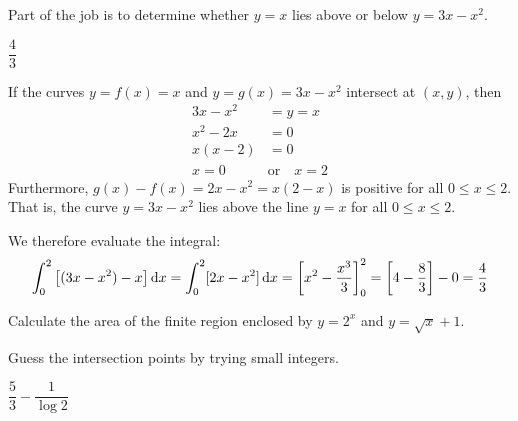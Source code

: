 \begin{hint}
Part of the job is to determine whether $y=x$ lies above or below
$y=3x-x^2$.
\end{hint}

\begin{answer}
$\dfrac{4}{3}$
\end{answer}

\begin{solution}
If the curves $y=f(x)=x$ and $y=g(x)=3x-x^2$ intersect at $(x,y)$, then
\begin{align*}
3x-x^2&=y=x\\
x^2-2x&=0\\
x(x-2)&=0\\
x=0 \quad &\mbox{or} \quad x=2
\end{align*}
Furthermore, $g(x)-f(x) = 2x-x^2 = x(2-x)$ is positive for all $0\le x\le 2$.
That is, the curve  $y=3x-x^2$ lies above the line $y=x$ for all $0\le x\le 2$.

\begin{center}
\end{center}

We therefore evaluate the integral:
\begin{align*}
 \int_0^2 \big[ (3x-x^2) - x \big] \,\mathrm{d}x
  = \int_0^2 [2x-x^2]\,\mathrm{d}x
   = \bigg[x^2 - \frac{x^3}{3}\bigg]^{2}_{0}
   = \bigg[ 4-\frac{8}{3} \bigg] -0
   = \frac{4}{3}
\end{align*}
\end{solution}



\begin{question}[2015A]
Calculate the area of the finite region enclosed by $y = 2^x$ and $y = \sqrt x+1$.
\end{question}

\begin{hint}
Guess the intersection points by trying small integers.
\end{hint}

\begin{answer}
$\dfrac{5}{3}-\dfrac{1}{\log 2}$
\end{answer}


